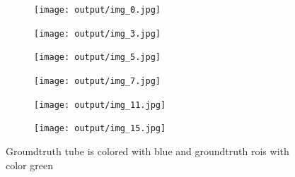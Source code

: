 \begin{figure}[h]
  \centering
  \begin{subfigure}{0.15\textwidth}
    \texttt{[image: output/img\_0.jpg]}
  \end{subfigure}
  \begin{subfigure}{0.15\textwidth}
    \texttt{[image: output/img\_3.jpg]}
  \end{subfigure}
  \begin{subfigure}{0.15\textwidth}
    \texttt{[image: output/img\_5.jpg]}
  \end{subfigure}
  \begin{subfigure}{0.15\textwidth}
    \texttt{[image: output/img\_7.jpg]}
  \end{subfigure}
  \begin{subfigure}{0.15\textwidth}
    \texttt{[image: output/img\_11.jpg]}
  \end{subfigure}
  \begin{subfigure}{0.15\textwidth}
    \texttt{[image: output/img\_15.jpg]}
  \end{subfigure}
  \caption{Groundtruth tube is colored with blue and groundtruth rois with color green}
  \label{fig:gt_tubes_and_rois}
\end{figure}

